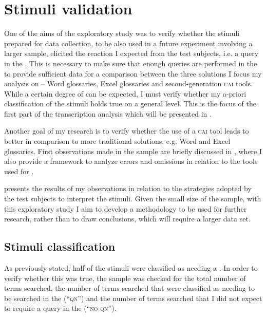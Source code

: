 \documentclass[output=paper]{langsci/langscibook}
\begin{document}
\section{Stimuli validation}\label{sec:prandi:5}
One of the aims of the exploratory study was to verify whether the stimuli prepared for data collection, to be also used in a future experiment involving a larger sample, elicited the reaction I expected from the test subjects, i.e. a query in the . This is necessary to make sure that enough queries are performed in the  to provide sufficient data for a comparison between the three  solutions I focus my analysis on – Word glossaries, Excel glossaries and second-generation \textsc{cai} tools. While a certain degree of  can be expected, I must verify whether my a-priori classification of the stimuli holds true on a general level. This is the focus of the first part of the transcription analysis which will be presented in .

Another goal of my research is to verify whether the use of a \textsc{cai} tool leads to better  in comparison to more traditional  solutions, e.g. Word and Excel glossaries. First observations made in the sample are briefly discussed in , where I also provide a framework to analyze errors and omissions in relation to the tools used for .

presents the results of my observations in relation to the strategies adopt\-ed by the test subjects to interpret the stimuli. Given the small size of the sample, with this exploratory study I aim to develop a methodology to be used for further research, rather than to draw conclusions, which will require a larger data set. 

\subsection{Stimuli classification}\label{sec:prandi:5.1}
As previously stated, half of the stimuli were classified as needing a . In order to verify whether this was true, the sample was checked for the total number of terms searched, the number of terms searched that were classified as needing to be searched in the  (``\textsc{qn}'') and the number of terms searched that I did not expect to require a query in the  (``\textsc{no qn}''). 
\end{document}
